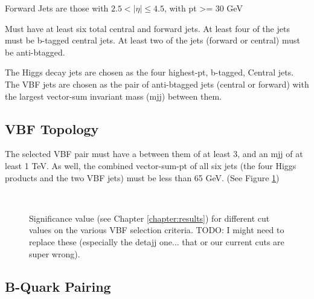         Forward Jets are those with $ 2.5 < |\eta| \leq 4.5 $, 
            with pt >= 30 GeV %

        Must have at least six total central and forward jets.
        At least four of the jets must be b-tagged central jets.
        At least two of the jets (forward or central) must be anti-btagged.

        The Higgs decay jets are chosen as the four highest-pt, b-tagged, Central jets.
        The VBF jets are chosen as the pair of anti-btagged jets (central or forward)
            with the largest vector-sum invariant mass (mjj) between them.


    \subsection{VBF Topology}
        
        The selected VBF pair must have a \deta between them of at least 3,
            and an mjj of at least 1 TeV.
        As well, the combined vector-sum-pt of all six jets
            (the four Higgs products and the two VBF jets)
            must be less than 65 GeV.
        (See Figure \ref{fig:vbf_cuts})

        \begin{figure}[tbh]
            \\
            \caption{
                Significance value (see Chapter \ref{chapter:results})
                    for different cut values on the various VBF selection criteria\cite{vbf_hh_4b_2018_int}.
                TODO: I might need to replace these (especially the detajj one... that or our current cuts are super wrong).
            }
            \label{fig:vbf_cuts}
        \end{figure}
        \FloatBarrier


    \subsection{B-Quark Pairing}

